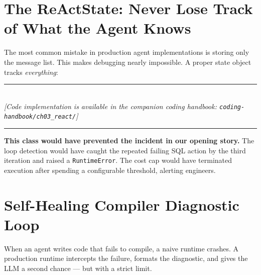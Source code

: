 \section{The ReActState: Never Lose Track of What the Agent Knows}

The most common mistake in production agent implementations is storing only the message list. This makes debugging nearly impossible. A proper state object tracks \textit{everything}:


\begin{center}
\noindent\rule{0.6\textwidth}{0.4pt} \\
\vspace{0.3em}
\textit{[Code implementation is available in the companion coding handbook: \texttt{coding-handbook/ch03\_react/}]} \\
\noindent\rule{0.6\textwidth}{0.4pt}
\end{center}


\textbf{This class would have prevented the incident in our opening story.} The loop detection would have caught the repeated failing SQL action by the third iteration and raised a \texttt{RuntimeError}. The cost cap would have terminated execution after spending a configurable threshold, alerting engineers.

\section{Self-Healing Compiler Diagnostic Loop}

When an agent writes code that fails to compile, a naive runtime crashes. A production runtime intercepts the failure, formats the diagnostic, and gives the LLM a second chance — but with a strict limit.

